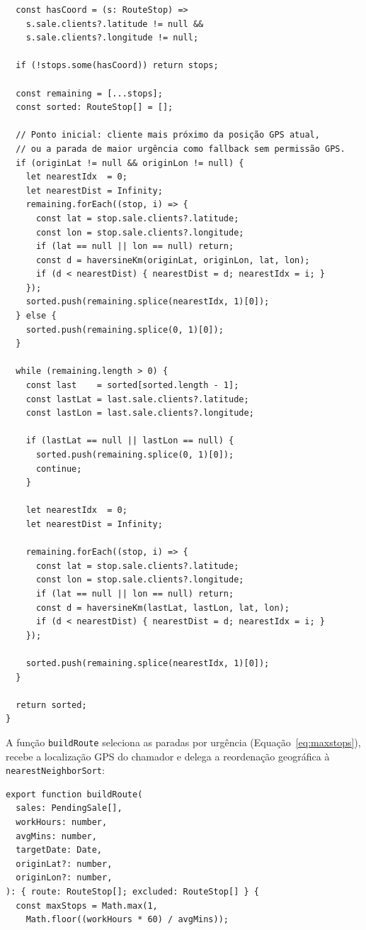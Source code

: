 \documentclass[
	12pt,				%
	oneside,			%
	a4paper,			%
	english,			%
	brazil				%
	]{abntex2}
\begin{document}
\begin{apendicesenv}
\begin{verbatim}
  const hasCoord = (s: RouteStop) =>
    s.sale.clients?.latitude != null &&
    s.sale.clients?.longitude != null;

  if (!stops.some(hasCoord)) return stops;

  const remaining = [...stops];
  const sorted: RouteStop[] = [];

  // Ponto inicial: cliente mais próximo da posição GPS atual,
  // ou a parada de maior urgência como fallback sem permissão GPS.
  if (originLat != null && originLon != null) {
    let nearestIdx  = 0;
    let nearestDist = Infinity;
    remaining.forEach((stop, i) => {
      const lat = stop.sale.clients?.latitude;
      const lon = stop.sale.clients?.longitude;
      if (lat == null || lon == null) return;
      const d = haversineKm(originLat, originLon, lat, lon);
      if (d < nearestDist) { nearestDist = d; nearestIdx = i; }
    });
    sorted.push(remaining.splice(nearestIdx, 1)[0]);
  } else {
    sorted.push(remaining.splice(0, 1)[0]);
  }

  while (remaining.length > 0) {
    const last    = sorted[sorted.length - 1];
    const lastLat = last.sale.clients?.latitude;
    const lastLon = last.sale.clients?.longitude;

    if (lastLat == null || lastLon == null) {
      sorted.push(remaining.splice(0, 1)[0]);
      continue;
    }

    let nearestIdx  = 0;
    let nearestDist = Infinity;

    remaining.forEach((stop, i) => {
      const lat = stop.sale.clients?.latitude;
      const lon = stop.sale.clients?.longitude;
      if (lat == null || lon == null) return;
      const d = haversineKm(lastLat, lastLon, lat, lon);
      if (d < nearestDist) { nearestDist = d; nearestIdx = i; }
    });

    sorted.push(remaining.splice(nearestIdx, 1)[0]);
  }

  return sorted;
}
\end{verbatim}

A função \texttt{buildRoute} seleciona as paradas por urgência (Equação~\ref{eq:maxstops}), recebe a localização GPS do chamador e delega a reordenação geográfica à \texttt{nearestNeighborSort}:

\begin{verbatim}
export function buildRoute(
  sales: PendingSale[],
  workHours: number,
  avgMins: number,
  targetDate: Date,
  originLat?: number,
  originLon?: number,
): { route: RouteStop[]; excluded: RouteStop[] } {
  const maxStops = Math.max(1,
    Math.floor((workHours * 60) / avgMins));


\end{verbatim}
\end{apendicesenv}
\end{document}
